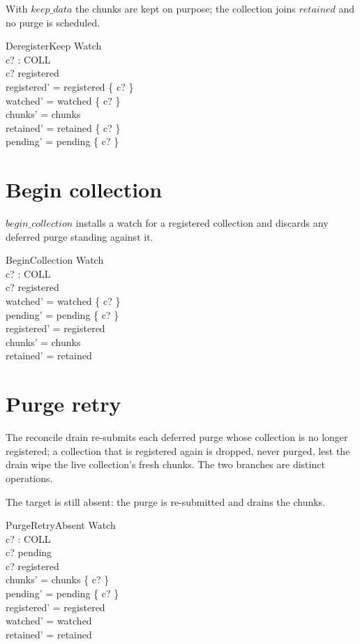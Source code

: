 \documentclass[a4paper]{article}
\begin{document}
With $keep\_data$ the chunks are kept on purpose; the collection joins
$retained$ and no purge is scheduled.

\begin{schema}{DeregisterKeep}
  \Delta Watch \\
  c? : COLL \\
  \where
  c? \in registered \\
  registered' = registered \setminus \{ c? \} \\
  watched' = watched \setminus \{ c? \} \\
  chunks' = chunks \\
  retained' = retained \cup \{ c? \} \\
  pending' = pending \setminus \{ c? \}
\end{schema}

\section{Begin collection}

$begin\_collection$ installs a watch for a registered collection and discards any
deferred purge standing against it.

\begin{schema}{BeginCollection}
  \Delta Watch \\
  c? : COLL \\
  \where
  c? \in registered \\
  watched' = watched \cup \{ c? \} \\
  pending' = pending \setminus \{ c? \} \\
  registered' = registered \\
  chunks' = chunks \\
  retained' = retained
\end{schema}

\section{Purge retry}

The reconcile drain re-submits each deferred purge whose collection is no longer
registered; a collection that is registered again is dropped, never purged, lest
the drain wipe the live collection's fresh chunks.  The two branches are
distinct operations.

The target is still absent: the purge is re-submitted and drains the chunks.

\begin{schema}{PurgeRetryAbsent}
  \Delta Watch \\
  c? : COLL \\
  \where
  c? \in pending \\
  c? \notin registered \\
  chunks' = chunks \setminus \{ c? \} \\
  pending' = pending \setminus \{ c? \} \\
  registered' = registered \\
  watched' = watched \\
  retained' = retained
\end{schema}
\end{document}
